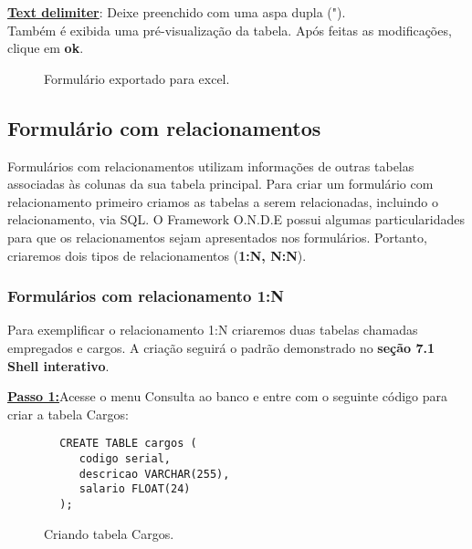 \documentclass[9pt]{report}
\begin{document}
{      \underline{\textbf{Text delimiter}}: Deixe preenchido com uma
      aspa dupla (").
      \\

      Também é exibida uma pré-visualização da tabela. Após feitas as
      modificações, clique em \textbf{ok}.

      \begin{figure}[H]
        \caption{Formulário exportado para excel.}
        \label{fig:exportexcelfim}
      \end{figure}
   
      \subsection{Formulário com relacionamentos}
      
      Formulários com relacionamentos utilizam informações de outras tabelas
      associadas às colunas da sua tabela principal. Para criar um formulário
      com relacionamento primeiro criamos as tabelas a serem relacionadas,
      incluindo o relacionamento, via SQL. O Framework O.N.D.E possui algumas
      particularidades para que os relacionamentos sejam apresentados nos
      formulários. Portanto, criaremos dois tipos de relacionamentos
      (\textbf{1:N, N:N}).
      
      \subsubsection{Formulários com relacionamento 1:N}
      
      Para exemplificar o relacionamento 1:N criaremos duas tabelas
      chamadas empregados e cargos. A criação seguirá o padrão
      demonstrado no \textbf{seção 7.1 Shell interativo}.

      \underline{\textbf{Passo 1:}}Acesse o menu Consulta ao banco e
      entre com o seguinte código para criar a tabela Cargos:

      \begin{lstlisting}
        CREATE TABLE cargos (
           codigo serial,
           descricao VARCHAR(255),
           salario FLOAT(24)
        );
      \end{lstlisting}

      \begin{figure}[H]
        \caption{Criando tabela Cargos.}
        \label{fig:criatablecargos}
      \end{figure}

}
\end{document}
